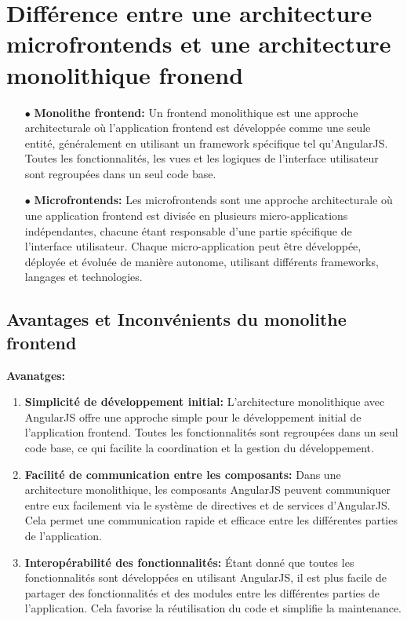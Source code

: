 \section{Différence entre une architecture microfrontends et une architecture monolithique fronend}
\begin{enumerate}
    \item[$\bullet$] \textbf{Monolithe frontend:} Un frontend monolithique est une approche architecturale où l'application frontend est développée comme une seule entité, généralement en utilisant un framework spécifique tel qu'AngularJS. Toutes les fonctionnalités, les vues et les logiques de l'interface utilisateur sont regroupées dans un seul code base.
    \item[$\bullet$] \textbf{Microfrontends:} Les microfrontends sont une approche architecturale où une application frontend est divisée en plusieurs micro-applications indépendantes, chacune étant responsable d'une partie spécifique de l'interface utilisateur. Chaque micro-application peut être développée, déployée et évoluée de manière autonome, utilisant différents frameworks, langages et technologies.
\end{enumerate}

\subsection{Avantages et Inconvénients du monolithe frontend}
\textbf{Avanatges:}
\begin{enumerate}
    \item \textbf{Simplicité de développement initial:} L'architecture monolithique avec AngularJS offre une approche simple pour le développement initial de l'application frontend. Toutes les fonctionnalités sont regroupées dans un seul code base, ce qui facilite la coordination et la gestion du développement.
    \item \textbf{Facilité de communication entre les composants:} Dans une architecture monolithique, les composants AngularJS peuvent communiquer entre eux facilement via le système de directives et de services d'AngularJS. Cela permet une communication rapide et efficace entre les différentes parties de l'application. 
    \item \textbf{Interopérabilité des fonctionnalités:} Étant donné que toutes les fonctionnalités sont développées en utilisant AngularJS, il est plus facile de partager des fonctionnalités et des modules entre les différentes parties de l'application. Cela favorise la réutilisation du code et simplifie la maintenance.
\end{enumerate}

